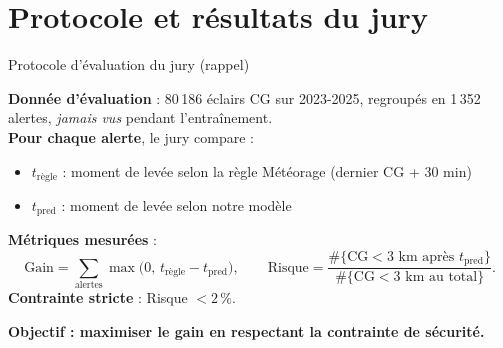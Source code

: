 \documentclass[aspectratio=169,t,11pt]{beamer}
\begin{document}
\section{Protocole et résultats du jury}

\begin{frame}{Protocole d'évaluation du jury (rappel)}
\vspace{-2pt}
\begin{tcolorbox}[mybox,colback=metBlue!5,colframe=metBlue,
  title={Critère officiel Data Battle 2026}]
\small
\textbf{Donnée d'évaluation} : 80\,186 éclairs CG sur 2023-2025, regroupés en 1\,352 alertes,
\emph{jamais vus} pendant l'entraînement.\\[4pt]
\textbf{Pour chaque alerte}, le jury compare :
\begin{itemize}\setlength\itemsep{1pt}
  \item $t_{\mathrm{règle}}$ : moment de levée selon la règle Météorage (dernier CG + 30 min)
  \item $t_{\mathrm{pred}}$ : moment de levée selon notre modèle
\end{itemize}
\vspace{2pt}
\textbf{Métriques mesurées} :
\[
\text{Gain} = \!\!\sum_{\text{alertes}}\!\! \max\!\bigl(0,\, t_{\mathrm{règle}} - t_{\mathrm{pred}}\bigr),
\qquad
\text{Risque} = \frac{\#\{\text{CG} < 3\text{ km après } t_{\mathrm{pred}}\}}{\#\{\text{CG} < 3\text{ km au total}\}}.
\]
\textbf{Contrainte stricte} : Risque $< 2\,\%$.
\end{tcolorbox}
\vspace{4pt}
\begin{center}
\small\color{metOrange}\textbf{Objectif : maximiser le gain en respectant la contrainte de sécurité.}
\end{center}
\end{frame}
\end{document}
